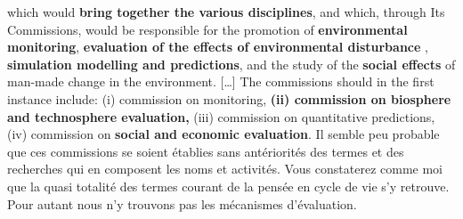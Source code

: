 {%
which would \textbf{bring together the various disciplines}, and which, through Its Commissions, would be responsible for the promotion of \textbf{environmental monitoring}, \textbf{evaluation of the effects of environmental disturbance} , \textbf{simulation modelling and predictions}, and the study of the \textbf{social effects} of man-made change in the environment.
[\ldots]
The commissions should in the first instance include:
(i) commission on monitoring,
\textbf{(ii) commission on biosphere and technosphere evaluation,}
(iii) commission on quantitative predictions,
(iv) commission on \textbf{social and economic evaluation}.}
Il semble peu probable que ces commissions se soient établies sans antériorités des termes et des recherches qui en composent les noms et activités.
Vous constaterez comme moi que la quasi totalité des termes courant de la pensée en cycle de vie s'y retrouve.
Pour autant nous n'y trouvons pas les mécanismes d'évaluation.



